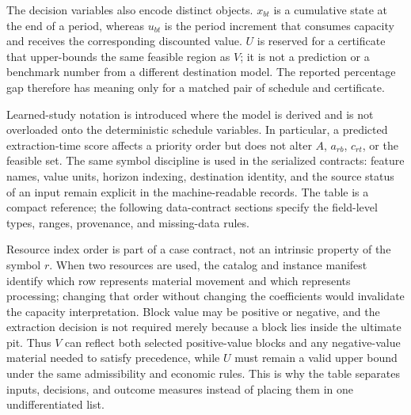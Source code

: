 The decision variables also encode distinct objects. $x_{bt}$ is a cumulative state at the end of a period, whereas $u_{bt}$ is the period increment that consumes capacity and receives the corresponding discounted value. $U$ is reserved for a certificate that upper-bounds the same feasible region as $V$; it is not a prediction or a benchmark number from a different destination model. The reported percentage gap therefore has meaning only for a matched pair of schedule and certificate.

Learned-study notation is introduced where the model is derived and is not overloaded onto the deterministic schedule variables. In particular, a predicted extraction-time score affects a priority order but does not alter $A$, $a_{rb}$, $c_{rt}$, or the feasible set. The same symbol discipline is used in the serialized contracts: feature names, value units, horizon indexing, destination identity, and the source status of an input remain explicit in the machine-readable records. The table is a compact reference; the following data-contract sections specify the field-level types, ranges, provenance, and missing-data rules.

Resource index order is part of a case contract, not an intrinsic property of the symbol $r$. When two resources are used, the catalog and instance manifest identify which row represents material movement and which represents processing; changing that order without changing the coefficients would invalidate the capacity interpretation. Block value may be positive or negative, and the extraction decision is not required merely because a block lies inside the ultimate pit. Thus $V$ can reflect both selected positive-value blocks and any negative-value material needed to satisfy precedence, while $U$ must remain a valid upper bound under the same admissibility and economic rules. This is why the table separates inputs, decisions, and outcome measures instead of placing them in one undifferentiated list.

